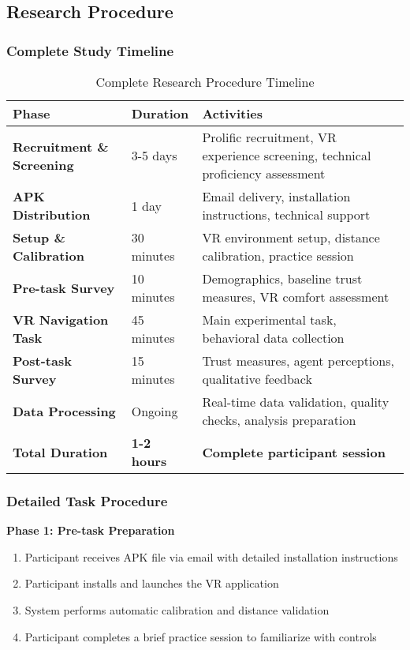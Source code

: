 \documentclass[12pt]{article}
\begin{document}
\subsection{Research Procedure}

\subsubsection{Complete Study Timeline}

\begin{table}[h]
\centering
\caption{Complete Research Procedure Timeline}
\begin{tabular}{@{}lll@{}}
\toprule
\textbf{Phase} & \textbf{Duration} & \textbf{Activities} \\
\midrule
\textbf{Recruitment \& Screening} & 3-5 days & Prolific recruitment, VR experience screening, technical proficiency assessment \\
\textbf{APK Distribution} & 1 day & Email delivery, installation instructions, technical support \\
\textbf{Setup \& Calibration} & 30 minutes & VR environment setup, distance calibration, practice session \\
\textbf{Pre-task Survey} & 10 minutes & Demographics, baseline trust measures, VR comfort assessment \\
\textbf{VR Navigation Task} & 45 minutes & Main experimental task, behavioral data collection \\
\textbf{Post-task Survey} & 15 minutes & Trust measures, agent perceptions, qualitative feedback \\
\textbf{Data Processing} & Ongoing & Real-time data validation, quality checks, analysis preparation \\
\midrule
\textbf{Total Duration} & \textbf{1-2 hours} & \textbf{Complete participant session} \\
\bottomrule
\end{tabular}
\end{table}

\subsubsection{Detailed Task Procedure}

\textbf{Phase 1: Pre-task Preparation}
\begin{enumerate}
    \item Participant receives APK file via email with detailed installation instructions
    \item Participant installs and launches the VR application
    \item System performs automatic calibration and distance validation
    \item Participant completes a brief practice session to familiarize with controls
\end{enumerate}
\end{document}

